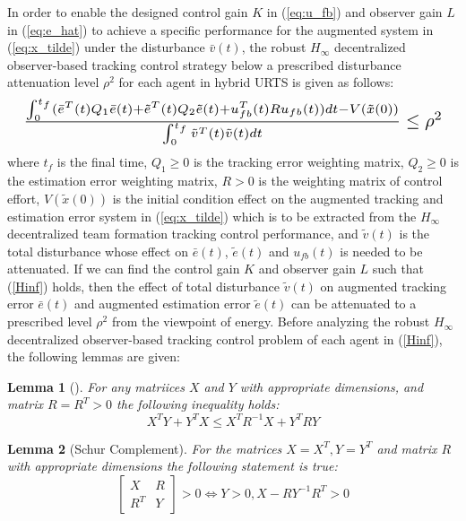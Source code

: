 \documentclass{ieeeaccess}
\newtheorem{lemma}{Lemma}
\begin{document}
In order to enable the designed control gain $K$ in (\ref{eq:u_fb}) and observer gain $L$ in (\ref{eq:e_hat}) to achieve a specific performance for the augmented system in (\ref{eq:x_tilde}) under the disturbance $\bar{v}(t)$, the robust $H_\infty$ decentralized observer-based tracking control strategy below a prescribed disturbance attenuation level $\rho^2$ for each agent in hybrid URTS is given as follows:
\begin{equation} \label{Hinf}
    \resizebox{1\hsize}{!}{    
        $\frac{\int_{0}^{t_f}(\bar{e}^T(t)Q_1\bar{e}(t) + \tilde{e}^T(t)Q_2\tilde{e}(t) + u_{fb}^T(t)Ru_{fb}(t))dt - V(\tilde{x}(0))}{\int_{0}^{t_f}\tilde{v}^T(t)\tilde{v}(t)dt}\leq \rho^2$
    }
\end{equation}
where $t_f$ is the final time, $Q_1 \geq 0$ is the tracking error weighting matrix, $Q_2 \geq 0$ is the estimation error weighting matrix, $R > 0$ is the weighting matrix of control effort, $V(\tilde{x}(0))$ is the initial condition effect on the augmented tracking and estimation error system in (\ref{eq:x_tilde}) which is to be extracted from the $H_\infty$ decentralized team formation tracking control performance, and $\tilde{v}(t)$ is the total disturbance whose effect on $\bar{e}(t)$, $\tilde{e}(t)$ and $u_{fb}(t)$ is needed to be attenuated. If we can find the control gain $K$ and observer gain $L$ such that (\ref{Hinf}) holds, then the effect of total disturbance $\tilde{v}(t)$ on augmented tracking error $\bar{e}(t)$ and augmented estimation error $\tilde{e}(t)$ can be attenuated to a prescribed level $\rho^2$ from the viewpoint of energy. Before analyzing the robust $H_\infty$ decentralized observer-based tracking control problem of each agent in (\ref{Hinf}), the following lemmas are given:
\begin{lemma}[\cite{boyd1994linear}] \label{lemma1}
    For any matriices $X$ and $Y$ with appropriate dimensions, and matrix $R=R^T>0$ the following inequality holds:
    \begin{equation} \label{}
        X^T Y + Y^T X \leq X^T R^{-1}X + Y^T R Y
    \end{equation}  
\end{lemma}
\begin{lemma}[Schur Complement\cite{boyd1994linear}] \label{lemma2}
    For the matrices $X=X^T,Y=Y^T$ and matrix $R$ with appropriate dimensions the following statement is true:
    \begin{equation} \label{}
        \begin{bmatrix}
            X & R \\ R^T & Y 
        \end{bmatrix} > 0 \Leftrightarrow Y>0, X-RY^{-1}R^T>0
    \end{equation}
\end{lemma}
\end{document}
